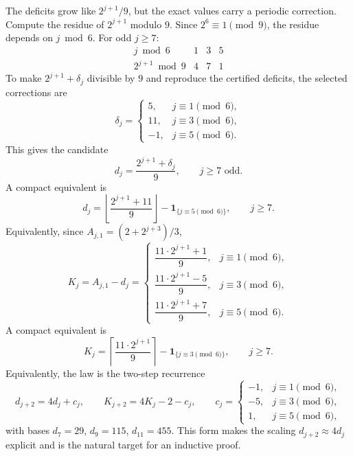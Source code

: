 \documentclass[11pt]{article}
\theoremstyle{remark}
\newcommand{\ind}{\mathbf{1}}
\begin{document}
The deficits grow like \(2^{j+1}/9\), but the exact values carry a periodic correction. Compute the residue of \(2^{j+1}\) modulo \(9\). Since \(2^6\equiv1\pmod9\), the residue depends on \(j\bmod6\). For odd \(j\ge7\):
\[
\begin{array}{c|ccc}
j\bmod6 & 1 & 3 & 5\\ \hline
2^{j+1}\bmod9 & 4 & 7 & 1
\end{array}
\]
To make \(2^{j+1}+\delta_j\) divisible by \(9\) and reproduce the certified deficits, the selected corrections are
\[
\delta_j=
\begin{cases}
5,&j\equiv1\pmod6,\\
11,&j\equiv3\pmod6,\\
-1,&j\equiv5\pmod6.
\end{cases}
\]
This gives the candidate
\begin{equation}\label{eq:dlaw}
\boxed{
d_j=\frac{2^{j+1}+\delta_j}{9},
\qquad j\ge7\text{ odd}.
}
\end{equation}
A compact equivalent is
\begin{equation}\label{eq:dfloor}
d_j=
\left\lfloor\frac{2^{j+1}+11}{9}\right\rfloor
-\ind_{\{j\equiv5\pmod6\}},
\qquad j\ge7.
\end{equation}
Equivalently, since \(A_{j,1}=(2+2^{j+3})/3\),
\begin{equation}\label{eq:Klaw}
\boxed{
K_j=A_{j,1}-d_j
=
\begin{cases}
\dfrac{11\cdot2^{j+1}+1}{9},&j\equiv1\pmod6,\\[6pt]
\dfrac{11\cdot2^{j+1}-5}{9},&j\equiv3\pmod6,\\[6pt]
\dfrac{11\cdot2^{j+1}+7}{9},&j\equiv5\pmod6.
\end{cases}
}
\end{equation}
A compact equivalent is
\begin{equation}\label{eq:Kceil}
K_j=
\left\lceil\frac{11\cdot2^{j+1}}{9}\right\rceil
-\ind_{\{j\equiv3\pmod6\}},
\qquad j\ge7.
\end{equation}
Equivalently, the law is the two-step recurrence
\begin{equation}\label{eq:recurrence}
d_{j+2}=4d_j+c_j,
\qquad
K_{j+2}=4K_j-2-c_j,
\qquad
c_j=
\begin{cases}
-1,&j\equiv1\pmod6,\\
-5,&j\equiv3\pmod6,\\
1,&j\equiv5\pmod6,
\end{cases}
\end{equation}
with bases \(d_7=29\), \(d_9=115\), \(d_{11}=455\). This form makes the scaling
\(d_{j+2}\approx4d_j\) explicit and is the natural target for an inductive proof.
\end{document}
